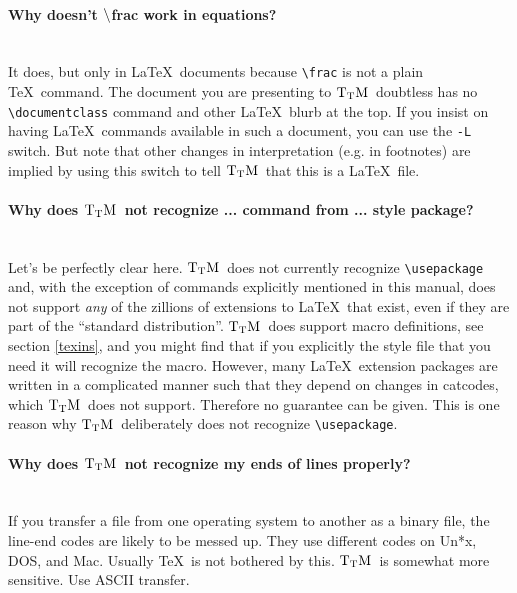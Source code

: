 \documentclass[12pt]{article}
\def\TtM{$\rm{}T_TH$}
\def\TtM{$\rm{}T_TM$}%
\begin{document}
\paragraph{Why doesn't $\tt\backslash$frac work in equations?}\leavevmode\\
It does, but only in \LaTeX\ documents because \verb|\frac| is not a
plain \TeX\ command. The document you are presenting to \TtM\ doubtless
has no \verb|\documentclass| command and other \LaTeX\ blurb at the top.
If you insist on having \LaTeX\ commands available in such a document,
you can use the \verb|-L| switch. But note that other changes in
interpretation (e.g. in footnotes) are implied by using this switch to
tell \TtM\ that this is a \LaTeX\ file.


\paragraph{Why does \TtM\ not recognize ... command from ... style
package?}\leavevmode\\
Let's be perfectly clear here. \TtM\ does not currently recognize 
\verb|\usepackage| and, with the exception of commands explicitly
mentioned in this manual, does not support \emph{any} of the zillions
of extensions to \LaTeX\ that exist, even if they are part of the
``standard distribution''. \TtM\ does support macro definitions, see
section \ref{texins}, and
you might find that if you explicitly \verb!! the style file
that you need it will recognize the macro. However, many \LaTeX\
extension packages are written in a complicated manner such that they
depend on changes in catcodes, which \TtM\ does not
support. Therefore no guarantee can be given. This is one reason why
\TtM\ deliberately does not recognize \verb|\usepackage|.

\paragraph{Why does \TtM\ not recognize my ends of lines properly?}\leavevmode\\
If you transfer a file from one operating system to another as a
binary file, the line-end codes are likely to be messed up. They use
different codes on Un*x, DOS, and Mac. Usually \TeX\ is not bothered by
this. \TtM\ is somewhat more sensitive. Use ASCII transfer.
\end{document}
